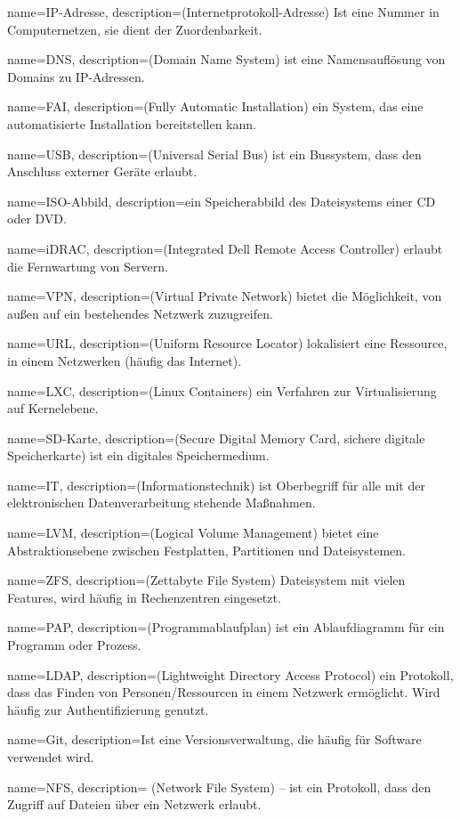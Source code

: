 {
name=IP-Adresse,
description={(Internetprotokoll-Adresse) Ist eine Nummer in Computernetzen, sie dient der Zuordenbarkeit.}
}

{
name=DNS,
description={(Domain Name System) ist eine Namensauflösung von Domains zu IP-Adressen.}
}

{
name=FAI,
description={(Fully Automatic Installation) ein System, das eine automatisierte Installation bereitstellen kann.} 
}

{
name=USB,
description={(Universal Serial Bus) ist ein Bussystem, dass den Anschluss externer Geräte erlaubt.}
}

{
name=ISO-Abbild,
description={ein Speicherabbild des Dateisystems einer CD oder DVD.}
}

{
name=iDRAC,
description={(Integrated Dell Remote Access Controller) erlaubt die Fernwartung von Servern.}
}

{
name=VPN,
description={(Virtual Private Network) bietet die Möglichkeit, von außen auf ein bestehendes Netzwerk zuzugreifen.}
}

{
name=URL,
description={(Uniform Resource Locator) lokalisiert eine Ressource, in einem Netzwerken (häufig das Internet).}
}

{
name=LXC,
description={(Linux Containers) ein Verfahren zur Virtualisierung auf Kernelebene.}
}

{
name=SD-Karte,
description={(Secure Digital Memory Card, sichere digitale Speicherkarte) ist ein digitales Speichermedium.}
}

{
name=IT,
description={(Informationstechnik) ist Oberbegriff für alle mit der elektronischen Datenverarbeitung stehende Maßnahmen.}
}

{
name=LVM,
description={(Logical Volume Management) bietet eine Abstraktionsebene zwischen Festplatten, Partitionen und Dateisystemen.}
}

{
name=ZFS,
description={(Zettabyte File System) Dateisystem mit vielen Features, wird häufig in Rechenzentren eingesetzt.}
}

{
name=PAP,
description={(Programmablaufplan) ist ein Ablaufdiagramm für ein Programm oder Prozess.}
}

{
name=LDAP,
description={(Lightweight Directory Access Protocol) ein Protokoll, dass das Finden von Personen/Ressourcen in einem Netzwerk ermöglicht. Wird häufig zur Authentifizierung genutzt.}
}

{
name=Git,
description={Ist eine Versionsverwaltung, die häufig für Software verwendet wird.}
}

{
name=NFS,
description={ (Network File System) – ist ein  Protokoll, dass den Zugriff auf Dateien über ein Netzwerk erlaubt.}
}